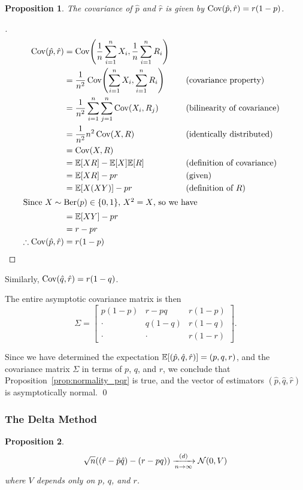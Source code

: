 \documentclass[letterpaper, oneside, reqno]{amsart}
\newtheorem{prop}{Proposition}[section]
\renewcommand{\qedsymbol}{\ensuremath{\blacksquare}}
\newenvironment{subproof}[1][\proofname]{%
  \renewcommand{\qedsymbol}{\ensuremath{\square}}%
  \begin{proof}[#1]%
}{%
  \end{proof}%
}
\numberwithin{equation}{section}
\newcommand{\E}[1]{\mathbb{E}\mleft[#1\mright]}
\newcommand{\Cov}[1]{\operatorname{Cov}\mleft(#1\mright)}
\newcommand{\N}[2]{\mathcal{N}\mleft( #1, #2 \mright)}
\newcommand{\sumi}[2]{\sum_{#1=1}^{#2}}
\newcommand{\avg}[2]{\frac{1}{#2}\sumi{#1}{#2}}
\newcommand{\by}[1]{&\quad&\text{(#1)}}
\newcommand{\Dlim}{\xrightarrow[n \to \infty]{(d)}}
\newcommand{\phat}{\hat{p}}
\newcommand{\qhat}{\hat{q}}
\newcommand{\rhat}{\hat{r}}
\DeclareMathOperator{\Ber}{Ber}
\begin{document}
\begin{prop}
  The covariance of $\phat$ and $\rhat$ is given by $\Cov{\phat, \rhat} = r(1 - p)$.
\end{prop}
\begin{subproof}
  \begin{alignat*}{3}
    \Cov{\phat, \rhat} &= \Cov{\avg{i}{n} X_i, \avg{i}{n} R_i} \\
    &= \frac{1}{n^2} \Cov{\sumi{i}{n} X_i, \sumi{i}{n} R_i} \by{covariance property} \\
    &= \frac{1}{n^2} \sumi{i}{n} \sumi{j}{n} \Cov{X_i, R_j} \by{bilinearity of covariance} \\
    &= \frac{1}{n^2} n^2 \Cov{X, R} \by{identically distributed} \\
    &= \Cov{X, R}  \\
    &= \E{X R} - \E{X}\E{R} \by{definition of covariance} \\
    &= \E{X R} - pr \by{given} \\
    &= \E{X (X Y)} - pr \by{definition of $R$} \\
    \intertext{Since $X \sim \Ber(p) \in \{0, 1\}$, $X^2 = X$, so we have}
    &= \E{X Y} - pr \\
    &= r - pr \\
    \therefore \Cov{\phat, \rhat} &= r(1 - p) \qedhere
  \end{alignat*}
\end{subproof}
\noindent Similarly, $\Cov{\qhat, \rhat} = r(1 - q)$.

The entire asymptotic covariance matrix is then
\begin{equation} \label{eq:sigma}
  \Sigma =
  \begin{bmatrix}
    p(1-p) & r - pq & r(1-p) \\
    \cdot & q(1-q) & r(1-q) \\
    \cdot & \cdot & r(1-r)
  \end{bmatrix}.
\end{equation}

Since we have determined the expectation $\E{(\phat, \qhat, \rhat)} = (p, q,
r)$, and the covariance matrix $\Sigma$ in terms of $p$, $q$, and $r$, we
conclude that Proposition~\ref{prop:normality_pqr} is true, and the vector of
estimators $(\phat, \qhat, \rhat)$ is asymptotically normal. \qed

\subsubsection{The Delta Method}
\begin{prop} \label{prop:delta}
  \[ \sqrt{n}\mleft((\rhat - \phat\qhat) - (r - pq)\mright) \Dlim \N{0}{V} \]
  where $V$ depends only on $p$, $q$, and $r$.
\end{prop}
\end{document}
